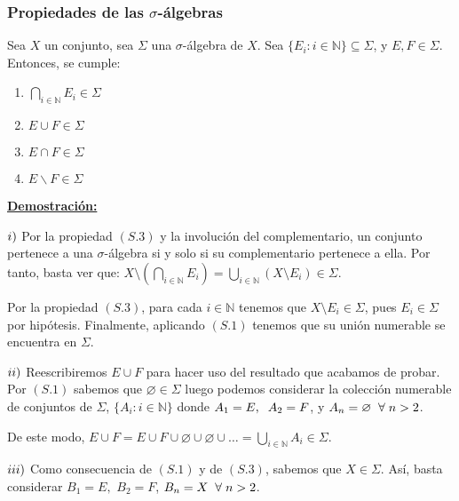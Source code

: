 \documentclass[12pt,a4paper]{article}
\newcommand{\N}{\mathbb{N}}
\newcounter{unit}[section]
\newcounter{chapter}[unit]
\renewcommand{\theunit}{\arabic{unit}}
\renewcommand{\thechapter}{\arabic{chapter}}
\renewcommand{\thesubsubsection}{\theunit.\thechapter.\arabic{subsubsection}}
\newcommand{\result}[1]{%
  \subsubsection{#1}%
  \label{result:\thesubsubsection}
}
\newcommand{\dem}{
    \noindent \underline{\textbf{Demostración:}}
}
\begin{document}
\vspace{4mm}
\result{Propiedades de las \texorpdfstring{$\sigma$}{s}-álgebras}
\hspace{3mm} Sea $X$ un conjunto, sea $\Sigma$ una $\sigma$-álgebra de $X$.
Sea $\{E_i : i \in \N\} \subseteq \Sigma$, y $E,F \in \Sigma$. Entonces, se cumple:
\begin{enumerate}[label=\roman*)]
    \item $\displaystyle{\bigcap_{i\in\N}{E_i}} \in \Sigma$
    \item $E\cup F \in \Sigma$
    \item $E \cap F \in \Sigma$
    \item $E \backslash F \in \Sigma$
\end{enumerate}

\vspace{2mm} \dem

\vspace{2mm}
$\romannumeral 1)$ Por la propiedad $(S.3)$ y la involución del complementario, un conjunto pertenece a una $\sigma$-álgebra si y solo si su complementario pertenece a ella.
Por tanto, basta ver que: \hspace{2mm}
$X \setminus \left(\bigcap_{i\in\N}{E_i}\right)
= \displaystyle{\bigcup_{i\in\N}{\left(X \setminus E_i\right)}} \in \Sigma$.

Por la propiedad $(S.3)$, para cada $i \in \N$ tenemos que $X\setminus E_i \in \Sigma$, pues $E_i \in \Sigma$ por hipótesis.
Finalmente, aplicando $(S.1)$ tenemos que su unión numerable se encuentra en $\Sigma$.

\vspace{4mm}
$\romannumeral 2)$ Reescribiremos $E\cup F$ para hacer uso del resultado que acabamos de probar.
Por $(S.1)$ sabemos que $\varnothing \in \Sigma$ luego podemos considerar la colección numerable de conjuntos de $\Sigma$,
$\{A_i : i \in \N\}$ donde $A_1 = E, \hspace{2mm} A_2 = F$, y $ A_n = \varnothing  \hspace{2mm} \forall \hspace{1mm} n > 2$.

\vspace{2mm} \noindent
De este modo, $E \cup F = E \cup F \cup \varnothing  \cup \varnothing \cup \ldots = \displaystyle{\bigcup_{i \in \N}{A_i}} \in \Sigma$.

\vspace{4mm}
$\romannumeral 3)$ Como consecuencia de $(S.1)$ y de $(S.3)$, sabemos que $X \in \Sigma$.
Así, basta considerar $B_1 = E,$ $B_2 = F$, $B_n = X \hspace{2mm} \forall \hspace{1mm} n > 2$.
\end{document}
